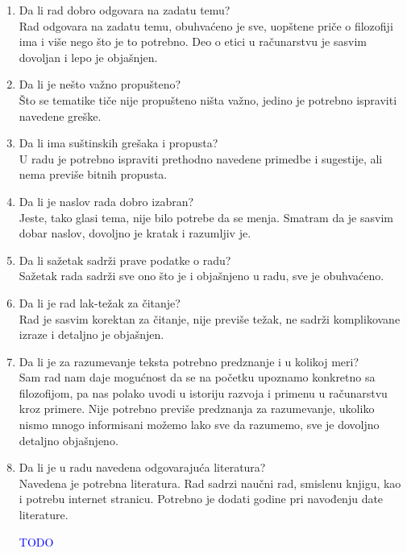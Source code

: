 \documentclass[a4paper]{report}
\newcommand{\odgovor}[1]{\textcolor{blue}{#1}}
\begin{document}
\begin{enumerate}
\item Da li rad dobro odgovara na zadatu temu?\\
Rad odgovara na zadatu temu, obuhvaćeno je sve, uopštene priče o filozofiji ima i više nego što je to potrebno. Deo o etici u računarstvu je sasvim dovoljan i lepo je objašnjen.

\item Da li je nešto važno propušteno?\\
Što se tematike tiče nije propušteno ništa važno, jedino je potrebno ispraviti navedene greške.

\item Da li ima suštinskih grešaka i propusta?\\
U radu je potrebno ispraviti prethodno navedene primedbe i sugestije, ali nema previše bitnih propusta.
\item Da li je naslov rada dobro izabran?\\
 Jeste, tako glasi tema, nije bilo potrebe da se menja. Smatram da je sasvim dobar naslov, dovoljno je kratak i razumljiv je.

\item Da li sažetak sadrži prave podatke o radu?\\
 Sažetak rada sadrži sve ono što je i objašnjeno u radu, sve je obuhvaćeno.

\item Da li je rad lak-težak za čitanje?\\
 Rad je sasvim korektan za čitanje, nije previše težak, ne sadrži komplikovane izraze i detaljno je objašnjen.

\item Da li je za razumevanje teksta potrebno predznanje i u kolikoj meri?\\ 
Sam rad nam daje mogućnost da se na početku upoznamo konkretno sa filozofijom, pa nas polako uvodi u istoriju razvoja i primenu u računarstvu kroz primere. Nije potrebno previše predznanja za razumevanje, ukoliko nismo mnogo informisani možemo lako sve da razumemo, sve je dovoljno detaljno objašnjeno.

\item Da li je u radu navedena odgovarajuća literatura?\\
Navedena je potrebna literatura. Rad sadrzi naučni rad, smislenu knjigu, kao i potrebu internet stranicu. Potrebno je dodati godine pri navođenju date literature.

\odgovor{TODO}


\end{enumerate}
\end{document}
